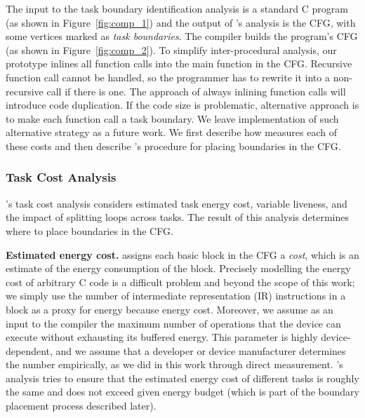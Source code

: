The input to the task boundary identification analysis is a standard C program (as shown in Figure~\ref{fig:comp_1}) and the output of \sys's analysis is the CFG, with some vertices marked as {\em task boundaries}. The \sys compiler builds the program's CFG (as shown in
Figure~\ref{fig:comp_2}). To simplify inter-procedural analysis, our prototype inlines all function calls into the main function in the CFG. Recursive function call cannot be handled, so the programmer has to rewrite it into a non-recursive call if there is one. The approach of always inlining function calls will introduce code duplication. If the code size is problematic, alternative approach is to make each function call a task boundary. We leave implementation of such alternative strategy as a future work.
%
%
We first describe how \sys measures each of these costs and then describe \sys's procedure for placing boundaries in the CFG.

\subsubsection{Task Cost Analysis}

\sys's task cost analysis considers estimated task energy cost, variable liveness, and the impact of splitting loops across tasks. The result of this analysis determines where to place boundaries in the CFG.
 
{\noindent \bf Estimated energy cost.} \sys assigns each basic block in the CFG a {\em cost}, which is an estimate of the energy consumption of the block. Precisely modelling the energy cost of arbitrary C code is a difficult problem and beyond the scope of this work; we simply use the number of intermediate representation (IR) instructions in a block as a proxy for energy because energy cost. Moreover, we assume as an input to the compiler the maximum number of operations that the device can execute without exhausting its buffered energy. This parameter is highly device-dependent, and we assume that a developer or device manufacturer determines the number empirically, as we did in this work through direct measurement. \sys's analysis tries to ensure that the estimated energy cost of different tasks is roughly the same and does not exceed given energy budget (which is part of the boundary placement process described later).

